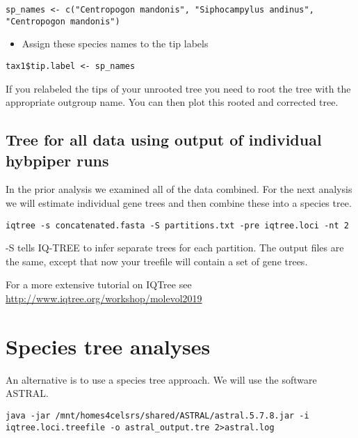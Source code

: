 \documentclass[
]{book}
\providecommand{\tightlist}{%
  \setlength{\itemsep}{0pt}\setlength{\parskip}{0pt}}
\begin{document}
\begin{verbatim}
sp_names <- c("Centropogon mandonis", "Siphocampylus andinus", "Centropogon mandonis")
\end{verbatim}

\begin{itemize}
\tightlist
\item
  Assign these species names to the tip labels
\end{itemize}

\begin{verbatim}
tax1$tip.label <- sp_names
\end{verbatim}

If you relabeled the tips of your unrooted tree you need to root the tree with the appropriate outgroup name. You can then plot this rooted and corrected tree.

\hypertarget{tree-for-all-data-using-output-of-individual-hybpiper-runs}{%
\subsection{Tree for all data using output of individual hybpiper runs}\label{tree-for-all-data-using-output-of-individual-hybpiper-runs}}

In the prior analysis we examined all of the data combined.
For the next analysis we will estimate individual gene trees and then combine these into a species tree.

\begin{verbatim}
iqtree -s concatenated.fasta -S partitions.txt -pre iqtree.loci -nt 2
\end{verbatim}

-S tells IQ-TREE to infer separate trees for each partition.
The output files are the same, except that now your treefile will contain a set of gene trees.

For a more extensive tutorial on IQTree see
\url{http://www.iqtree.org/workshop/molevol2019}

\hypertarget{species-tree-analyses}{%
\section{Species tree analyses}\label{species-tree-analyses}}

An alternative is to use a species tree approach.
We will use the software ASTRAL.

\begin{verbatim}
java -jar /mnt/homes4celsrs/shared/ASTRAL/astral.5.7.8.jar -i iqtree.loci.treefile -o astral_output.tre 2>astral.log
\end{verbatim}
\end{document}
